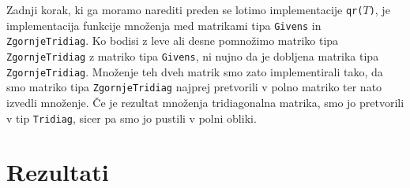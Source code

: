 \documentclass[11pt, titlepage]{article}
\begin{document}
Zadnji korak, ki ga moramo narediti preden se lotimo implementacije \texttt{qr($T$)}, je implementacija funkcije množenja med matrikami tipa \texttt{Givens} in \texttt{ZgornjeTridiag}. Ko bodisi z leve ali desne pomnožimo matriko tipa \texttt{ZgornjeTridiag}
z matriko tipa \texttt{Givens}, ni nujno da je dobljena matrika tipa \texttt{ZgornjeTridiag}. Množenje teh dveh matrik smo zato implementirali tako, da smo matriko tipa \texttt{ZgornjeTridiag} najprej pretvorili v polno matriko ter
nato izvedli množenje. Če je rezultat množenja tridiagonalna matrika, smo jo pretvorili v tip \texttt{Tridiag}, sicer pa smo jo pustili v polni obliki.

\section{Rezultati}
\end{document}
